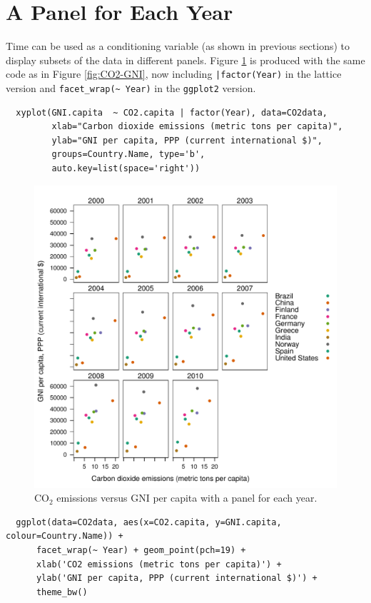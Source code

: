 \section{A Panel for Each Year}
\label{sec:org485a375}
Time can be used as a conditioning variable (as shown in previous
sections) to display subsets of the data in different panels. Figure
\ref{fig:CO2-GNI-panel} is produced with the same code as in Figure
\ref{fig:CO2-GNI}, now including \texttt{|factor(Year)} in the lattice
version and \texttt{facet\_wrap(\textasciitilde{} Year)} in the \texttt{ggplot2} version.

\lstset{language=r,label= ,caption= ,captionpos=b,numbers=none}
\begin{lstlisting}
  xyplot(GNI.capita  ~ CO2.capita | factor(Year), data=CO2data,
         xlab="Carbon dioxide emissions (metric tons per capita)",
         ylab="GNI per capita, PPP (current international $)",
         groups=Country.Name, type='b',
         auto.key=list(space='right'))
\end{lstlisting}

\begin{figure}[htbp]
\centering
\includegraphics[width=.9\linewidth]{figs/CO2_capita_panel.pdf}
\caption{\(\mathrm{CO_2}\) emissions versus GNI per capita with a panel for each year. \label{fig:CO2-GNI-panel}}
\end{figure}

\lstset{language=r,label= ,caption= ,captionpos=b,numbers=none}
\begin{lstlisting}
  ggplot(data=CO2data, aes(x=CO2.capita, y=GNI.capita, colour=Country.Name)) +
      facet_wrap(~ Year) + geom_point(pch=19) + 
      xlab('CO2 emissions (metric tons per capita)') +
      ylab('GNI per capita, PPP (current international $)') +
      theme_bw()
\end{lstlisting}

